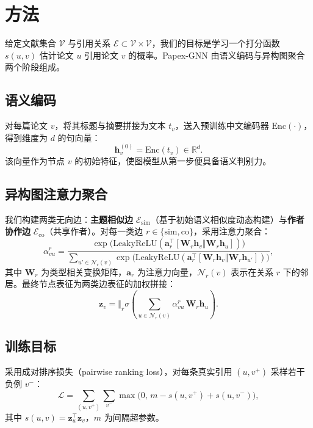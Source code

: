 \section{方法}
给定文献集合 $\mathcal{V}$ 与引用关系 $\mathcal{E}\subset \mathcal{V}\times\mathcal{V}$，我们的目标是学习一个打分函数 $s(u,v)$ 估计论文 $u$ 引用论文 $v$ 的概率。Papex-GNN 由语义编码与异构图聚合两个阶段组成。

\subsection{语义编码}
对每篇论文 $v$，将其标题与摘要拼接为文本 $t_v$，送入预训练中文编码器 $\mathrm{Enc}(\cdot)$，得到维度为 $d$ 的句向量：
\begin{equation}
  \mathbf{h}_v^{(0)} = \mathrm{Enc}(t_v) \in \mathbb{R}^{d}.
\end{equation}
该向量作为节点 $v$ 的初始特征，使图模型从第一步便具备语义判别力。

\subsection{异构图注意力聚合}
我们构建两类无向边：\textbf{主题相似边} $\mathcal{E}_{\mathrm{sim}}$（基于初始语义相似度动态构建）与\textbf{作者协作边} $\mathcal{E}_{\mathrm{co}}$（共享作者）。对每一类边 $r\in\{\mathrm{sim},\mathrm{co}\}$，采用注意力聚合：
\begin{equation}
  \alpha_{vu}^{r} = \frac{\exp\!\big(\mathrm{LeakyReLU}(\mathbf{a}_r^{\top}[\mathbf{W}_r\mathbf{h}_v \mathbin\Vert \mathbf{W}_r\mathbf{h}_u])\big)}
  {\sum_{u'\in\mathcal{N}_r(v)}\exp\!\big(\mathrm{LeakyReLU}(\mathbf{a}_r^{\top}[\mathbf{W}_r\mathbf{h}_v \mathbin\Vert \mathbf{W}_r\mathbf{h}_{u'}])\big)},
\end{equation}
其中 $\mathbf{W}_r$ 为类型相关变换矩阵，$\mathbf{a}_r$ 为注意力向量，$\mathcal{N}_r(v)$ 表示在关系 $r$ 下的邻居。最终节点表征为两类边表征的加权拼接：
\begin{equation}
  \mathbf{z}_v = \big\Vert_{r} \sigma\!\left(\sum_{u\in\mathcal{N}_r(v)} \alpha_{vu}^{r}\,\mathbf{W}_r\mathbf{h}_u\right).
\end{equation}

\subsection{训练目标}
采用成对排序损失（pairwise ranking loss），对每条真实引用 $(u,v^+)$ 采样若干负例 $v^-$：
\begin{equation}
  \mathcal{L} = \sum_{(u,v^+)} \sum_{v^-} \max\big(0,\, m - s(u,v^+) + s(u,v^-)\big),
\end{equation}
其中 $s(u,v)=\mathbf{z}_u^{\top}\mathbf{z}_v$，$m$ 为间隔超参数。
